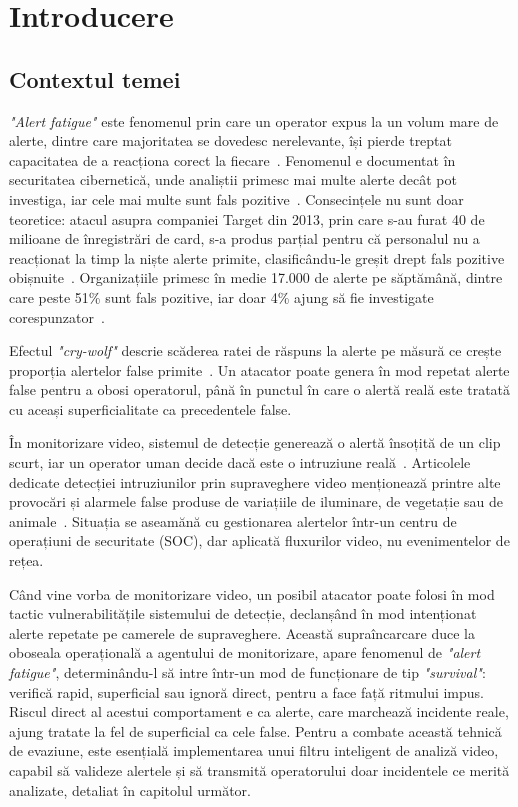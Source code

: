 \chapter{Introducere}\label{ch:intro}
\pagestyle{fancy}

\section{Contextul temei}

\textit{"Alert fatigue"} este fenomenul prin care un operator
expus la un volum mare de alerte, dintre care majoritatea
se dovedesc nerelevante, își pierde treptat capacitatea de a 
reacționa corect la fiecare~\cite{Ndichu2026}. Fenomenul
e documentat în securitatea cibernetică, unde analiștii
primesc mai multe alerte decât pot investiga, iar cele mai multe
sunt fals pozitive~\cite{Hassan2019}. Consecințele nu sunt
doar teoretice: atacul asupra companiei Target din 2013, 
prin care s-au furat 40 de milioane de înregistrări
de card, s-a produs parțial pentru că personalul nu a reacționat la timp la niște alerte
primite, clasificându-le greșit drept fals pozitive obișnuite~\cite{Hassan2019}.
Organizațiile
primesc în medie 17.000 de alerte pe săptămână, dintre care
peste 51\% sunt fals pozitive, iar doar 4\% ajung să fie investigate 
corespunzator~\cite{Hassan2019}.

Efectul \textit{"cry-wolf"} descrie scăderea ratei de răspuns la
alerte pe măsură ce crește proporția alertelor false primite~\cite{bliss1995reversal}. 
Un atacator poate genera
în mod repetat alerte false pentru a obosi operatorul, până în punctul în care
o alertă reală este tratată cu aceași superficialitate ca precedentele
false. 

În monitorizare video, sistemul de detecție generează
o alertă însoțită de un clip scurt, iar un operator uman
decide dacă este o intruziune reală~\cite{Lohani2022}.
Articolele dedicate detecției intruziunilor prin supraveghere video
menționează printre alte provocări și alarmele false produse
de variațiile de iluminare, de vegetație sau de animale~\cite{Lohani2022}.
Situația se aseamănă cu gestionarea alertelor într-un centru de
operațiuni de securitate (SOC), dar aplicată fluxurilor video, nu evenimentelor
de rețea.

Când vine vorba de monitorizare video, un posibil atacator poate folosi
în mod tactic vulnerabilitățile sistemului de detecție, declanșând în mod
intenționat alerte repetate pe camerele de supraveghere. Această 
supraîncarcare duce la oboseala operațională a agentului de monitorizare, 
apare fenomenul de \textit{"alert fatigue"}, determinându-l să intre 
într-un mod de funcționare de tip
\textit{"survival"}: verifică rapid, superficial sau ignoră direct, pentru a face față
ritmului impus. Riscul direct al acestui comportament e ca alerte, care
marchează incidente reale, ajung tratate la fel de superficial ca cele false.
Pentru a combate această
tehnică de evaziune, este esențială implementarea unui filtru inteligent
de analiză video, capabil să valideze alertele și să transmită operatorului
doar incidentele ce merită analizate, detaliat în capitolul următor. 

